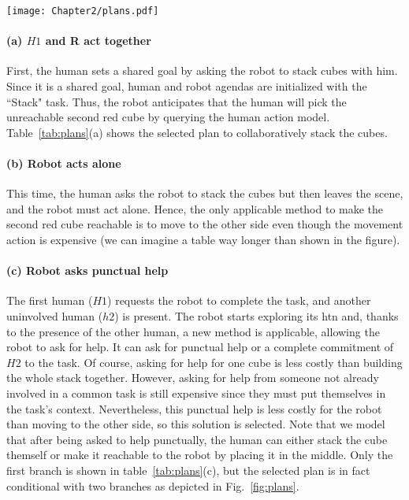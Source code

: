 \begin{sidewaysfigure}
    \centering 
    \texttt{[image: Chapter2/plans.pdf]}
    \caption{Illustration of the incremental exploration of various courses of actions corresponding to scenarios depicted in Fig.~\ref{fig:scenarios}(b), (c), and (d). Since $H1$ requests the robot to complete the task without establishing a shared goal, the robot agenda only contains the task to achieve, and the agenda of $H2$ starts empty.}
    \label{fig:plans}
\end{sidewaysfigure}

\paragraph{(a) $H1$ and R act together}
First, the human sets a shared goal by asking the robot to stack cubes with him. Since it is a shared goal, human and robot agendas are initialized with the ``Stack" task. Thus, the robot anticipates that the human will pick the unreachable second red cube by querying the human action model. Table~\ref {tab:plans}(a) shows the selected plan to collaboratively stack the cubes. 

\paragraph{(b) Robot acts alone}
This time, the human asks the robot to stack the cubes but then leaves the scene, and the robot must act alone. Hence, the only applicable method to make the second red cube reachable is to move to the other side even though the movement action is expensive (we can imagine a table way longer than shown in the figure).

\paragraph{(c) Robot asks punctual help}
The first human ($H1$) requests the robot to complete the task, and another uninvolved human ($h2$) is present. The robot starts exploring its \acrshort{htn} and, thanks to the presence of the other human, a new method is applicable, allowing the robot to ask for help. It can ask for punctual help or a complete commitment of $H2$ to the task. Of course, asking for help for one cube is less costly than building the whole stack together. However, asking for help from someone not already involved in a common task is still expensive since they must put themselves in the task's context. 
Nevertheless, this punctual help is less costly for the robot than moving to the other side, so this solution is selected. Note that we model that after being asked to help punctually, the human can either stack the cube themself or make it reachable to the robot by placing it in the middle. Only the first branch is shown in table~\ref{tab:plans}(c), but the selected plan is in fact conditional with two branches as depicted in Fig.~\ref{fig:plans}.

